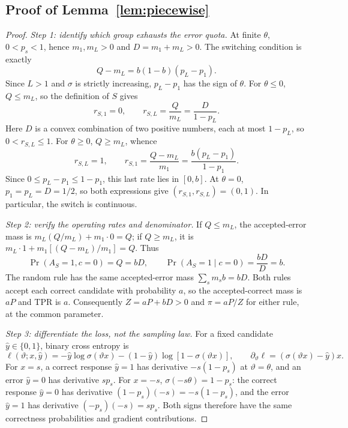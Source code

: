 \subsection{Proof of Lemma~\ref{lem:piecewise}}
\begin{proof}
\textit{Step 1: identify which group exhausts the error quota.}
At finite $\theta$, $0<p_s<1$, hence $m_1,m_L>0$ and $D=m_1+m_L>0$.
The switching condition is exactly
\begin{equation}
 Q-m_L=b(1-b)(p_L-p_1).
 \label{eq:app-quota-switch}
\end{equation}
Since $L>1$ and $\sigma$ is strictly increasing, $p_L-p_1$ has the sign of
$\theta$. For $\theta\leq0$, $Q\leq m_L$, so the definition of $S$ gives
\[
 r_{S,1}=0,\qquad r_{S,L}=\frac{Q}{m_L}=\frac{D}{1-p_L}.
\]
Here $D$ is a convex combination of two positive numbers, each at most
$1-p_L$, so $0<r_{S,L}\leq1$. For $\theta\geq0$, $Q\geq m_L$, whence
\[
 r_{S,L}=1,\qquad r_{S,1}=\frac{Q-m_L}{m_1}
                         =\frac{b(p_L-p_1)}{1-p_1}.
\]
Since $0\leq p_L-p_1\leq1-p_1$, this last rate lies in $[0,b]$.
At $\theta=0$, $p_1=p_L=D=1/2$, so both expressions give
$(r_{S,1},r_{S,L})=(0,1)$. In particular, the switch is continuous.

\textit{Step 2: verify the operating rates and denominator.}
If $Q\leq m_L$, the accepted-error mass is
$m_L(Q/m_L)+m_1\cdot0=Q$; if $Q\geq m_L$, it is
$m_L\cdot1+m_1[(Q-m_L)/m_1]=Q$. Thus
\[
 \Pr(A_S=1,c=0)=Q=bD,
 \qquad \Pr(A_S=1\mid c=0)=\frac{bD}{D}=b.
\]
The random rule has the same accepted-error mass $\sum_s m_s b=bD$.
Both rules accept each correct candidate with probability $a$, so the
accepted-correct mass is $aP$ and TPR is $a$. Consequently $Z=aP+bD>0$
and $\pi=aP/Z$ for either rule, at the common parameter.

\textit{Step 3: differentiate the loss, not the sampling law.}
For a fixed candidate $\hat y\in\{0,1\}$, binary cross entropy is
\[
 \ell(\vartheta;x,\hat y)
 =-\hat y\log\sigma(\vartheta x)
   -(1-\hat y)\log[1-\sigma(\vartheta x)],
 \qquad \partial_\vartheta\ell=(\sigma(\vartheta x)-\hat y)x.
\]
For $x=s$, a correct response $\hat y=1$ has derivative $-s(1-p_s)$ at
$\vartheta=\theta$, and an error $\hat y=0$ has derivative $sp_s$.
For $x=-s$, $\sigma(-s\theta)=1-p_s$: the correct response $\hat y=0$
has derivative $(1-p_s)(-s)=-s(1-p_s)$, and the error $\hat y=1$ has
derivative $(-p_s)(-s)=sp_s$. Both signs therefore have the same
correctness probabilities and gradient contributions.


\end{proof}
